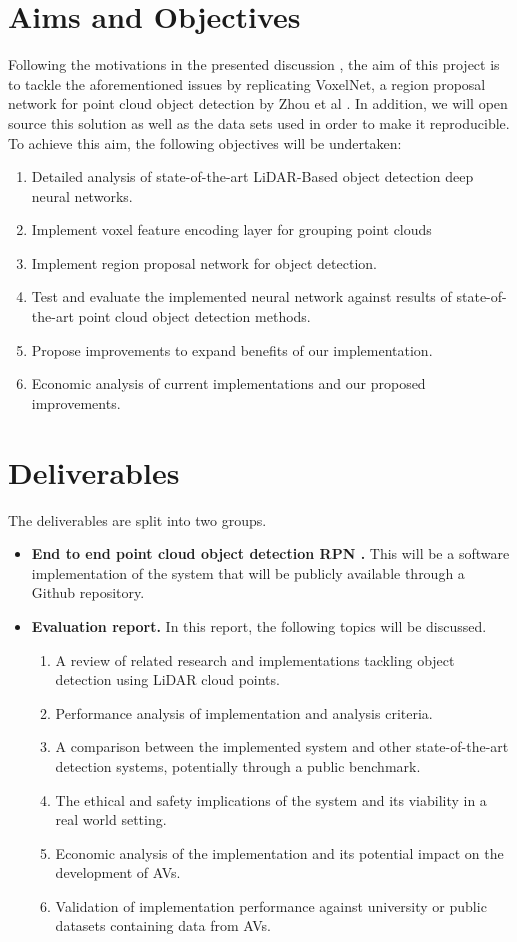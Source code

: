 \section{Aims and Objectives}
Following the motivations in the presented discussion , the aim of this project is to  tackle the aforementioned issues by replicating VoxelNet, a region proposal network for point cloud object detection by Zhou et al \cite{zhou2017voxelnet}. In addition, we will open source this solution as well as the data sets used in order to make it reproducible. 
To achieve this aim, the following objectives will be undertaken:
\begin{enumerate}
	\item Detailed analysis of state-of-the-art LiDAR-Based object detection deep neural networks.
	\item Implement voxel feature encoding layer for grouping point clouds
	\item Implement region proposal network for object detection.
	\item Test and evaluate the implemented neural network against results of state-of-the-art point cloud object detection methods.
	\item Propose improvements to expand benefits of our implementation.
	\item Economic analysis of current implementations and our proposed improvements. 
\end{enumerate}

\section{Deliverables}

The deliverables are split into two groups. 
\begin{itemize}
	 \item \textbf{End to end point cloud object detection RPN \cite{ren2015faster} .} This will be a software implementation of the system that will be publicly available through a Github repository. 
	\item \textbf{Evaluation report.} In this report, the following topics will be discussed. 
	\begin{enumerate}
		\item A review of related research and implementations tackling object detection using LiDAR cloud points. 
		\item Performance analysis of implementation and analysis criteria.
		\item A comparison between the implemented system and other state-of-the-art detection systems, potentially through a public benchmark. 
		\item The ethical and safety implications of the system and its viability in a real world setting. 
		\item Economic analysis of the implementation and its potential impact on the development of AVs. 
		\item Validation of implementation performance against university or public datasets containing data from AVs. 
	\end{enumerate}
\end{itemize}

